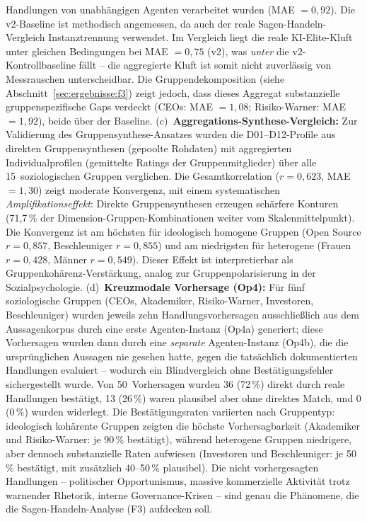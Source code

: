 \documentclass[12pt,a4paper]{article}
\begin{document}
Handlungen von unabhängigen Agenten verarbeitet wurden (MAE $= 0{,}92$). Die v2-Baseline ist methodisch angemessen, da auch der reale Sagen-Handeln-Vergleich Instanztrennung verwendet. Im Vergleich liegt die reale KI-Elite-Kluft unter gleichen Bedingungen bei MAE $= 0{,}75$ (v2), was \emph{unter} die v2-Kontrollbaseline fällt -- die aggregierte Kluft ist somit nicht zuverlässig von Messrauschen unterscheidbar. Die Gruppendekomposition (siehe Abschnitt~\ref{sec:ergebnisse:f3}) zeigt jedoch, dass dieses Aggregat substanzielle gruppenspezifische Gaps verdeckt (CEOs: MAE $= 1{,}08$; Risiko-Warner: MAE $= 1{,}92$), beide über der Baseline. (c)~\textbf{Aggregations-Synthese-Vergleich:} Zur Validierung des Gruppensynthese-Ansatzes wurden die D01--D12-Profile aus direkten Gruppensynthesen (gepoolte Rohdaten) mit aggregierten Individualprofilen (gemittelte Ratings der Gruppenmitglieder) über alle 15~soziologischen Gruppen verglichen. Die Gesamtkorrelation ($r = 0{,}623$, MAE $= 1{,}30$) zeigt moderate Konvergenz, mit einem systematischen \emph{Amplifikationseffekt}: Direkte Gruppensynthesen erzeugen schärfere Konturen (71{,}7\,\% der Dimension-Gruppen-Kombinationen weiter vom Skalenmittelpunkt). Die Konvergenz ist am höchsten für ideologisch homogene Gruppen (Open Source $r = 0{,}857$, Beschleuniger $r = 0{,}855$) und am niedrigsten für heterogene (Frauen $r = 0{,}428$, Männer $r = 0{,}549$). Dieser Effekt ist interpretierbar als Gruppenkohärenz-Verstärkung, analog zur Gruppenpolarisierung in der Sozialpsychologie. (d)~\textbf{Kreuzmodale Vorhersage (Op4):} Für fünf soziologische Gruppen (CEOs, Akademiker, Risiko-Warner, Investoren, Beschleuniger) wurden jeweils zehn Handlungsvorhersagen ausschließlich aus dem Aussagenkorpus durch eine erste Agenten-Instanz (Op4a) generiert; diese Vorhersagen wurden dann durch eine \emph{separate} Agenten-Instanz (Op4b), die die ursprünglichen Aussagen nie gesehen hatte, gegen die tatsächlich dokumentierten Handlungen evaluiert -- wodurch ein Blindvergleich ohne Bestätigungsfehler sichergestellt wurde. Von 50~Vorhersagen wurden 36 (72\,\%) direkt durch reale Handlungen bestätigt, 13 (26\,\%) waren plausibel aber ohne direktes Match, und 0 (0\,\%) wurden widerlegt. Die Bestätigungsraten variierten nach Gruppentyp: ideologisch kohärente Gruppen zeigten die höchste Vorhersagbarkeit (Akademiker und Risiko-Warner: je 90\,\% bestätigt), während heterogene Gruppen niedrigere, aber dennoch substanzielle Raten aufwiesen (Investoren und Beschleuniger: je 50\,\% bestätigt, mit zusätzlich 40--50\,\% plausibel). Die nicht vorhergesagten Handlungen -- politischer Opportunismus, massive kommerzielle Aktivität trotz warnender Rhetorik, interne Governance-Krisen -- sind genau die Phänomene, die die Sagen-Handeln-Analyse (F3) aufdecken soll.
\end{document}
